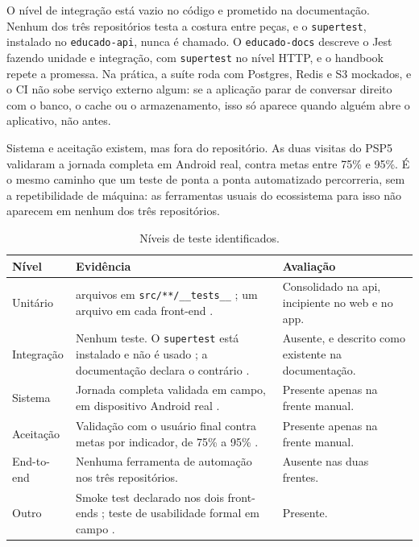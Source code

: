 O nível de integração está vazio no código e prometido na documentação. Nenhum
dos três repositórios testa a costura entre peças, e o \texttt{supertest},
instalado no \texttt{educado-api}, nunca é chamado. O \texttt{educado-docs}
\cite{educado-repos} descreve o Jest fazendo unidade e integração, com
\texttt{supertest} no nível HTTP, e o handbook repete a promessa. Na prática, a
suíte roda com Postgres, Redis e S3 mockados, e o CI não sobe serviço externo
algum: se a aplicação parar de conversar direito com o banco, o cache ou o
armazenamento, isso só aparece quando alguém abre o aplicativo, não antes.

Sistema e aceitação existem, mas fora do repositório. As duas visitas do PSP5
\cite[p.~17]{psp5} validaram a jornada completa em Android real, contra metas entre
75\% e 95\%. É o mesmo caminho que um teste de ponta a ponta automatizado
percorreria, sem a repetibilidade de máquina: as ferramentas usuais do
ecossistema para isso não aparecem em nenhum dos três repositórios.

\begin{table}[H]
\centering
\caption{Níveis de teste identificados.}
\label{tab:niveis}
{\footnotesize
\begin{tabularx}{\textwidth}{>{\raggedright\arraybackslash}p{2.2cm} >{\raggedright\arraybackslash}X >{\raggedright\arraybackslash}p{3.0cm}}
\toprule
\textbf{Nível} & \textbf{Evidência} & \textbf{Avaliação} \\
\midrule

Unitário
& 31 arquivos em \texttt{src/**/\_\_tests\_\_} \cite{educado-repos}; um arquivo em cada front-end \cite{educado-repos}.
& Consolidado na api, incipiente no web e no app.
\\
\addlinespace

Integração
& Nenhum teste. O \texttt{supertest} está instalado e não é usado \cite{educado-repos}; a documentação declara o contrário \cite{educado-repos}.
& Ausente, e descrito como existente na documentação.
\\
\addlinespace

Sistema
& Jornada completa validada em campo, em dispositivo Android real \cite[p.~17]{psp5}.
& Presente apenas na frente manual.
\\
\addlinespace

Aceitação
& Validação com o usuário final contra metas por indicador, de 75\% a 95\% \cite{dashboard}.
& Presente apenas na frente manual.
\\
\addlinespace

End-to-end
& Nenhuma ferramenta de automação nos três repositórios.
& Ausente nas duas frentes.
\\
\addlinespace

Outro
& Smoke test declarado nos dois front-ends \cite{educado-repos}; teste de usabilidade formal em campo \cite[p.~14]{psp5}.
& Presente.
\\

\bottomrule
\end{tabularx}
}
\end{table}


